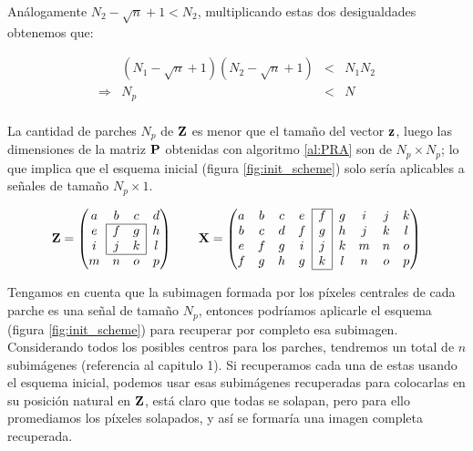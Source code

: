 An\'alogamente $N_2 -\sqrt{n} + 1 < N_2$, multiplicando estas dos desigualdades obtenemos que:

\begin{equation}
	\begin{array}{lrcl}
	                & (N_1 - \sqrt{n} + 1)(N_2 - \sqrt{n} + 1) &<& N_1N_2 \\ 
	\Longrightarrow &                                      N_p &<& N      \\
	\label{eq:patches_ineq}
	\end{array}
\end{equation}

La cantidad de parches $N_p$ de $\Z$ es menor que el tamaño del vector $\z$, luego las dimensiones de la matriz $\P$ obtenidas con algoritmo \ref{al:PRA} son de $N_p \times N_p$; lo que implica que el esquema inicial (figura \ref{fig:init_scheme}) solo ser\'ia aplicables a señales de tamaño $N_p \times 1$.

\begin{figure}[h]
	\[\Z = \left(
	\begin{matrix}
	a & b & c & d\\\cline{2-3}
	e & \multicolumn{1}{|c}{f} & \multicolumn{1}{c|}{g} & h\\
	i & \multicolumn{1}{|c}{j} & \multicolumn{1}{c|}{k} & l\\\cline{2-3}
	m & n & o & p\\
	\end{matrix}
	\right)
	\qquad\X = \left(
	\begin{matrix}\cline{5-5}
	a & b & c & e & \multicolumn{1}{|c|}{f} & g & i & j & k\\
	b & c & d & f & \multicolumn{1}{|c|}{g} & h & j & k & l\\
	e & f & g & i & \multicolumn{1}{|c|}{j} & k & m & n & o\\
	f & g & h & g & \multicolumn{1}{|c|}{k} & l & n & o & p\\\cline{5-5}
	\end{matrix}
	\right)
	\]
\end{figure}

Tengamos en cuenta que la subimagen formada por los p\'ixeles centrales de cada parche es una señal de tamaño $N_p$, entonces podr\'iamos aplicarle el esquema (figura \ref{fig:init_scheme}) para recuperar por completo esa subimagen. Considerando todos los posibles centros para los parches, tendremos un total de $n$ subim\'agenes (referencia al capitulo 1). Si recuperamos cada una de estas usando el esquema inicial, podemos usar esas subim\'agenes recuperadas para colocarlas en su posición natural en $\Z$, est\'a claro que todas se solapan, pero para ello promediamos los p\'ixeles solapados, y así se formar\'ia una imagen completa recuperada.  

